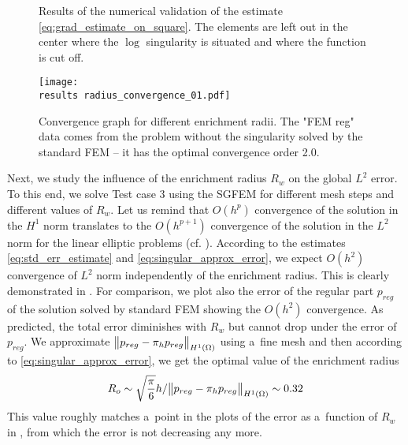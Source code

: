 %
\begin{figure}[!htb]
  \centering    
  \hspace{0pt}
  \caption[Log error estimate.]
  {
  Results of the numerical validation of the estimate \eqref{eq:grad_estimate_on_square}. The elements are left out 
  in the center where the $\log$ singularity is situated and where the function is cut off.
  }
  \label{fig:log_estimate}
\end{figure}
%

\begin{figure}[!htb]
  \centering    
  \texttt{[image: \\results radius\_convergence\_01.pdf]}
  \caption[Convergence for different enrichment radii.]{Convergence graph for different enrichment radii. The "FEM reg"
  data comes from the problem without the singularity solved by the standard FEM -- it has the optimal convergence order 2.0.}
  \label{fig:radius_conv_1}
\end{figure}
%
Next, we study the influence of the enrichment radius $R_w$ on the global $L^2$ error. To this end, we solve Test case 3
using the SGFEM for different mesh steps and different values of $R_w$.
Let us remind that $O(h^p)$ convergence of the solution in the $H^1$ norm translates to the $O(h^{p+1})$ convergence of the solution in the $L^2$ norm 
for the linear elliptic problems (cf. \cite[Theorem 19.2]{ciarlet_basic_1991}). According to the estimates \eqref{eq:std_err_estimate}
and \eqref{eq:singular_approx_error}, we expect $O(h^2)$ convergence of $L^2$ norm independently of the enrichment radius. This is 
clearly demonstrated in . For comparison, we plot also the error of the regular part $p_{reg}$ of the solution
solved by standard FEM showing the $O(h^2)$ convergence.
As predicted, the total error diminishes with $R_w$ but cannot 
drop under the error of $p_{reg}$. We approximate $\bigl\Vert p_{reg} - \pi_h p_{reg}\bigr\Vert_{H^1(\Omega)}$
using a~fine mesh and then according to \eqref{eq:singular_approx_error},
we get the optimal value of the enrichment radius
\[
    R_o \sim \sqrt{\frac{\pi}{6}} h/\bigl\Vert p_{reg} - \pi_h p_{reg}\bigr\Vert_{H^1(\Omega)} \sim 0.32
\]
This value roughly matches a~point in the plots of the error as a~function of $R_w$ in
, from which the error is not decreasing any more.



